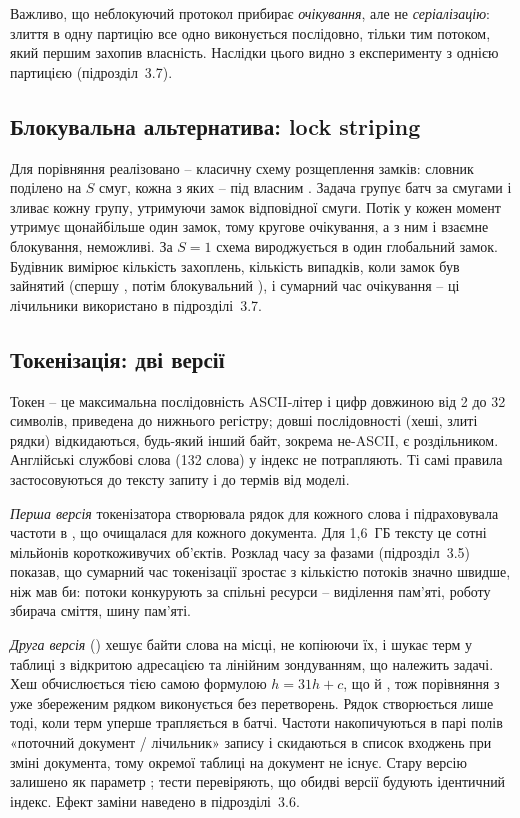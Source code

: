 Важливо, що неблокуючий протокол прибирає \textit{очікування}, але не \textit{серіалізацію}:
злиття в одну партицію все одно виконується послідовно, тільки тим потоком, який першим
захопив власність. Наслідки цього видно з експерименту з однією партицією (підрозділ~3.7).

\subsection{Блокувальна альтернатива: lock striping}

Для порівняння реалізовано  -- класичну схему розщеплення замків:
словник поділено на $S$ смуг, кожна з яких --  під власним .
Задача групує батч за смугами і зливає кожну групу, утримуючи замок відповідної смуги. Потік
у кожен момент утримує щонайбільше один замок, тому кругове очікування, а з ним і взаємне
блокування, неможливі. За $S = 1$ схема вироджується в один глобальний замок. Будівник
вимірює кількість захоплень, кількість випадків, коли замок був зайнятий (спершу
, потім блокувальний ), і сумарний час очікування -- ці лічильники
використано в підрозділі~3.7.

\subsection{Токенізація: дві версії}

Токен -- це максимальна послідовність ASCII-літер і цифр довжиною від 2 до 32 символів,
приведена до нижнього регістру; довші послідовності (хеші, злиті рядки) відкидаються, будь-який
інший байт, зокрема не-ASCII, є роздільником. Англійські службові слова (132 слова) у
індекс не потрапляють. Ті самі правила застосовуються до тексту запиту і до термів від моделі.

\textit{Перша версія} токенізатора створювала рядок  для кожного слова і
підраховувала частоти в , що очищалася для кожного документа. Для 1,6~ГБ
тексту це сотні мільйонів короткоживучих об'єктів. Розклад часу за фазами (підрозділ~3.5)
показав, що сумарний час токенізації зростає з кількістю потоків значно швидше, ніж мав би:
потоки конкурують за спільні ресурси -- виділення пам'яті, роботу збирача сміття, шину пам'яті.

\textit{Друга версія} () хешує байти слова на місці, не копіюючи їх, і
шукає терм у таблиці з відкритою адресацією та лінійним зондуванням, що належить задачі.
Хеш обчислюється тією самою формулою $h = 31h + c$, що й , тож
порівняння з уже збереженим рядком виконується без перетворень. Рядок створюється лише тоді,
коли терм уперше трапляється в батчі. Частоти накопичуються в парі полів
«поточний документ / лічильник» запису і скидаються в список входжень при зміні документа,
тому окремої таблиці на документ не існує. Стару версію залишено як параметр
; тести перевіряють, що обидві версії будують ідентичний індекс.
Ефект заміни наведено в підрозділі~3.6.

